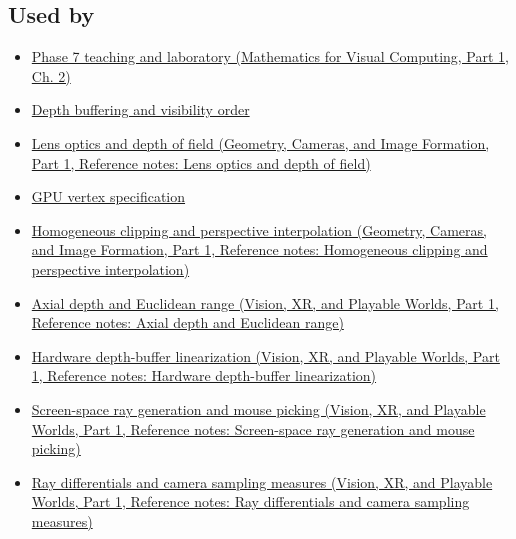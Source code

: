 \subsection{Used by}\label{appendix-1c07d64f5e70-used-by}

\hypertarget{appendix-1c07d64f5e70-used-by}{}

\begin{itemize}
\item
  \href{../02-Mathematics-for-Visual-Computing-P01/main.pdf\#nameddest=01-foundations-i-ch018-keep-the-promises-visible-while-moving-between-representations}{Phase 7 teaching and laboratory (Mathematics for Visual Computing, Part 1, Ch. 2)}
\item
  \hyperref[appendix-97578ed97952]{Depth buffering and visibility order}
\item
  \href{../03-Geometry-Cameras-and-Image-Formation-P01/main.pdf\#nameddest=appendix-21f8456e2629}{Lens optics and depth of field (Geometry, Cameras, and Image Formation, Part 1, Reference notes: Lens optics and depth of field)}
\item
  \hyperref[appendix-749ba51a6c25]{GPU vertex specification}
\item
  \href{../03-Geometry-Cameras-and-Image-Formation-P01/main.pdf\#nameddest=appendix-40426e4b2103}{Homogeneous clipping and perspective interpolation (Geometry, Cameras, and Image Formation, Part 1, Reference notes: Homogeneous clipping and perspective interpolation)}
\item
  \href{../07-Vision-XR-and-Playable-Worlds-P01/main.pdf\#nameddest=appendix-cac01ebeeb11}{Axial depth and Euclidean range (Vision, XR, and Playable Worlds, Part 1, Reference notes: Axial depth and Euclidean range)}
\item
  \href{../07-Vision-XR-and-Playable-Worlds-P01/main.pdf\#nameddest=appendix-1bc40b08db4a}{Hardware depth-buffer linearization (Vision, XR, and Playable Worlds, Part 1, Reference notes: Hardware depth-buffer linearization)}
\item
  \href{../07-Vision-XR-and-Playable-Worlds-P01/main.pdf\#nameddest=appendix-f1a6d43e80d1}{Screen-space ray generation and mouse picking (Vision, XR, and Playable Worlds, Part 1, Reference notes: Screen-space ray generation and mouse picking)}
\item
  \href{../07-Vision-XR-and-Playable-Worlds-P01/main.pdf\#nameddest=appendix-8c40fad29462}{Ray differentials and camera sampling measures (Vision, XR, and Playable Worlds, Part 1, Reference notes: Ray differentials and camera sampling measures)}
\end{itemize}

